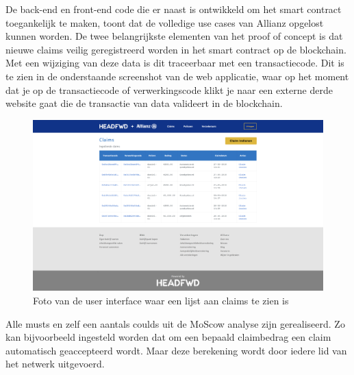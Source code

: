 De back-end en front-end code die er naast is ontwikkeld om het smart contract toegankelijk te maken, toont dat de volledige use cases van Allianz opgelost kunnen worden. De twee belangrijkste elementen van het proof of concept is dat nieuwe claims veilig geregistreerd worden in het smart contract op de blockchain. Met een wijziging van deze data is dit traceerbaar met een transactiecode. Dit is te zien in de onderstaande screenshot van de web applicatie, waar op het moment dat je op de transactiecode of verwerkingscode klikt je naar een externe derde website gaat die de transactie van data valideert in de blockchain.
\begin{figure}[h]
    \begin{center}
        \includegraphics[width=\paperwidth-200]{images/claim-list}
        \caption{Foto van de user interface waar een lijst aan claims te zien is}
        \label{fig:claim-list}
    \end{center}
\end{figure}
Alle musts en zelf een aantals coulds uit de MoScow analyse zijn gerealiseerd. Zo kan bijvoorbeeld ingesteld worden dat om een bepaald claimbedrag een claim automatisch geaccepteerd wordt. Maar deze berekening wordt door iedere lid van het netwerk uitgevoerd.